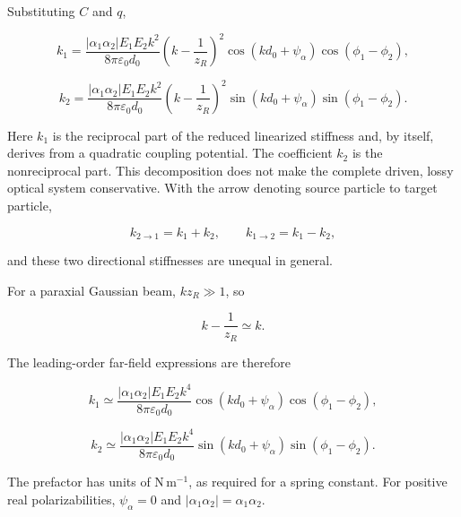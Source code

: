 Substituting $C$ and $q$,

\[
k_1 = \frac{|\alpha_1\alpha_2|E_1E_2k^2}
{8\pi\varepsilon_0d_0}
\left(k-\frac{1}{z_R}\right)^2
\cos(kd_0+\psi_\alpha)\cos(\phi_1-\phi_2),
\]

\[
k_2 = \frac{|\alpha_1\alpha_2|E_1E_2k^2}
{8\pi\varepsilon_0d_0}
\left(k-\frac{1}{z_R}\right)^2
\sin(kd_0+\psi_\alpha)\sin(\phi_1-\phi_2).
\]

Here $k_1$ is the reciprocal part of the reduced linearized stiffness and, by
itself, derives from a quadratic coupling potential.  The coefficient $k_2$
is the nonreciprocal part.  This decomposition does not make the complete
driven, lossy optical system conservative.  With the arrow denoting source
particle to target particle,

\[
k_{2\to1}=k_1+k_2, \qquad k_{1\to2}=k_1-k_2,
\]

and these two directional stiffnesses are unequal in general.

For a paraxial Gaussian beam, $kz_R\gg1$, so

\[
k-\frac{1}{z_R}\simeq k.
\]

The leading-order far-field expressions are therefore

\[
k_1 \simeq \frac{|\alpha_1\alpha_2|E_1E_2k^4}
{8\pi\varepsilon_0d_0}
\cos(kd_0+\psi_\alpha)\cos(\phi_1-\phi_2),
\]

\[
k_2 \simeq \frac{|\alpha_1\alpha_2|E_1E_2k^4}
{8\pi\varepsilon_0d_0}
\sin(kd_0+\psi_\alpha)\sin(\phi_1-\phi_2).
\]

The prefactor has units of $\mathrm{N\,m^{-1}}$, as required for a spring
constant.  For positive real polarizabilities, $\psi_\alpha=0$ and
$|\alpha_1\alpha_2|=\alpha_1\alpha_2$.
